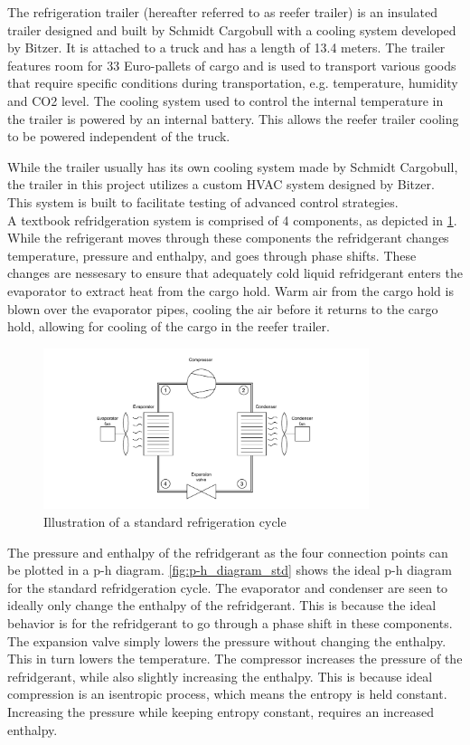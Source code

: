 The refrigeration trailer (hereafter referred to as reefer trailer) is an insulated trailer designed and built by Schmidt Cargobull with a cooling system developed by Bitzer. It is attached to a truck and has a length of 13.4 meters. The trailer features room for 33 Euro-pallets of cargo and is used to transport various goods that require specific  conditions during transportation, e.g. temperature, humidity and CO2 level. The cooling system used to control the internal temperature in the trailer is powered by an internal battery. This allows the reefer trailer cooling to be powered independent of the truck.

While the trailer usually has its own cooling system made by Schmidt Cargobull, the trailer in this project utilizes a custom HVAC system designed by Bitzer. This system is built to facilitate testing of advanced control strategies.\\

A textbook refridgeration system is comprised of 4 components, as depicted in \cref{fig:HVAC_Diagram_std}. While the refrigerant moves through these components the refridgerant changes temperature, pressure and enthalpy, and goes through phase shifts. These changes are nessesary to ensure that adequately cold liquid refridgerant enters the evaporator to extract heat from the cargo hold. Warm air from the cargo hold is blown over the evaporator pipes, cooling the air before it returns to the cargo hold, allowing for cooling of the cargo in the reefer trailer. 

\begin{figure}[h!]
	\centering
	\includegraphics[width=0.85\textwidth]{Graphics/HVAC_Diagram_std.pdf}
	\caption{Illustration of a standard refrigeration cycle}
	\label{fig:HVAC_Diagram_std}
\end{figure}

The pressure and enthalpy of the refridgerant as the four connection points can be plotted in a p-h diagram. \cref{fig:p-h_diagram_std} shows the ideal p-h diagram for the standard refridgeration cycle. The evaporator and condenser are seen to ideally only change the enthalpy of the refridgerant. This is because the ideal behavior is for the refridgerant to go through a phase shift in these components. The expansion valve simply lowers the pressure without changing the enthalpy. This in turn lowers the temperature. The compressor increases the pressure of the refridgerant, while also slightly increasing the enthalpy. This is because ideal compression is an isentropic process, which means the entropy is held constant. Increasing the pressure while keeping entropy constant, requires an increased enthalpy. \\


